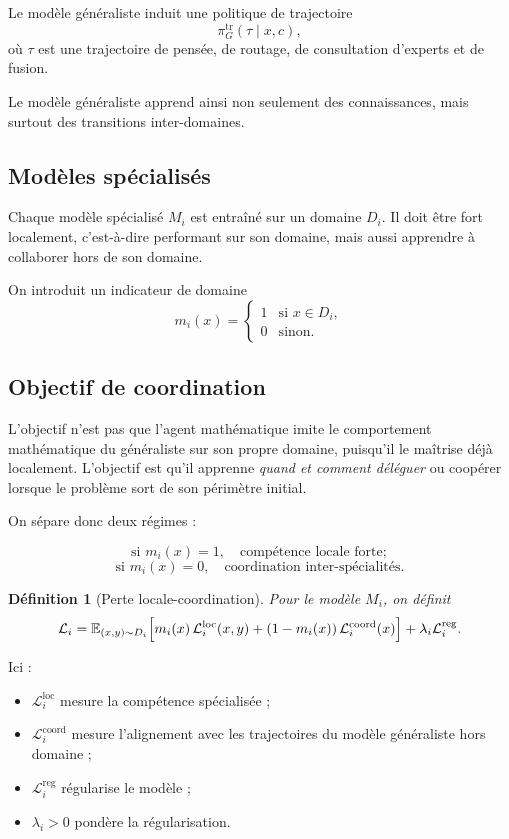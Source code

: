 \documentclass[11pt,a4paper]{article}
\newtheorem{definition}{Définition}[section]
\newcommand{\1}{\mathbf 1}
\begin{document}
Le modèle généraliste induit une politique de trajectoire
\[
\pi_G^{\mathrm{tr}}(\tau\mid x,c),
\]
où \(\tau\) est une trajectoire de pensée, de routage, de consultation d'experts et de fusion.

Le modèle généraliste apprend ainsi non seulement des connaissances, mais surtout des transitions inter-domaines.

\subsection{Modèles spécialisés}

Chaque modèle spécialisé \(M_i\) est entraîné sur un domaine \(D_i\).
Il doit être fort localement, c'est-à-dire performant sur son domaine, mais aussi apprendre à collaborer hors de son domaine.

On introduit un indicateur de domaine
\[
m_i(x)=
\begin{cases}
1 & \text{si } x\in D_i,\\
0 & \text{sinon.}
\end{cases}
\]

\subsection{Objectif de coordination}

L'objectif n'est pas que l'agent mathématique imite le comportement mathématique du généraliste sur son propre domaine, puisqu'il le maîtrise déjà localement.
L'objectif est qu'il apprenne \emph{quand et comment déléguer} ou coopérer lorsque le problème sort de son périmètre initial.

On sépare donc deux régimes :

\[
\text{si } m_i(x)=1,\quad \text{compétence locale forte};
\]
\[
\text{si } m_i(x)=0,\quad \text{coordination inter-spécialités}.
\]

\begin{definition}[Perte locale-coordination]
Pour le modèle \(M_i\), on définit
\[
\mathcal L_i
=
\mathbb E_{(x,y)\sim D_i}
\Bigl[
m_i(x)\,\mathcal L_i^{\mathrm{loc}}(x,y)
+
(1-m_i(x))\,\mathcal L_i^{\mathrm{coord}}(x)
\Bigr]
+
\lambda_i \mathcal L_i^{\mathrm{reg}}.
\]
\end{definition}

Ici :
\begin{itemize}[leftmargin=2em]
    \item \(\mathcal L_i^{\mathrm{loc}}\) mesure la compétence spécialisée ;
    \item \(\mathcal L_i^{\mathrm{coord}}\) mesure l'alignement avec les trajectoires du modèle généraliste hors domaine ;
    \item \(\mathcal L_i^{\mathrm{reg}}\) régularise le modèle ;
    \item \(\lambda_i>0\) pondère la régularisation.
\end{itemize}
\end{document}
